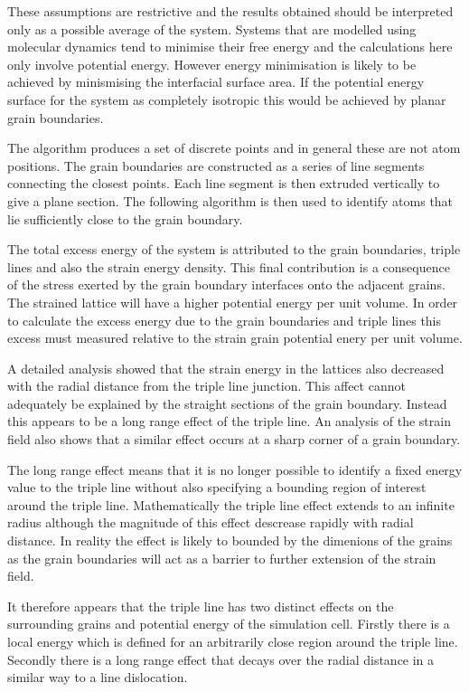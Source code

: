 \documentclass[12pt,a4paper]{book}
\begin{document}
These assumptions are restrictive and the results obtained should be interpreted only as a possible average of the system. Systems that are modelled using molecular dynamics tend to minimise their free energy and the calculations here only involve potential energy. However energy minimisation is likely to be achieved by minismising the interfacial surface area. If the potential energy surface for the system as completely isotropic this would be achieved by planar grain boundaries.    

The algorithm produces a set of discrete points and in general these are not atom positions. The grain boundaries are constructed as a series of line segments connecting the closest points. Each line segment is then extruded vertically to give a plane section. The following algorithm is then used to identify atoms that lie sufficiently close to the grain boundary.

The total excess energy of the system is attributed to the grain boundaries, triple lines and also the strain energy density. This final contribution is a consequence of the stress exerted by the grain boundary interfaces onto the adjacent grains. The strained lattice will have a higher potential energy per unit volume. In order to calculate the excess energy due to the grain boundaries and triple lines this excess must measured relative to the strain grain potential enery per unit volume. 

A detailed analysis showed that the strain energy in the lattices also decreased with the radial distance from the triple line junction. This affect cannot adequately be explained by the straight sections of the grain boundary. Instead this appears to be a long range effect of the triple line. An analysis of the strain field also shows that a similar effect occurs at a sharp corner of a grain boundary.
 
The long range effect means that it is no longer possible to identify a fixed energy value to the triple line without also specifying a bounding region of interest around the triple line. Mathematically the triple line effect extends to an infinite radius although the magnitude of this effect descrease rapidly with radial distance. In reality the effect is likely to bounded by the dimenions of the grains as the grain boundaries will act as a barrier to further extension of the strain field. 

It therefore appears that the triple line has two distinct effects on the surrounding grains and potential energy of the simulation cell. Firstly there is a local energy which is defined for an arbitrarily close region around the triple line. Secondly there is a long range effect that decays over the radial distance in a similar way to a line dislocation.
\end{document}
